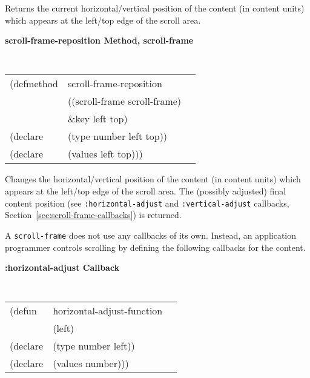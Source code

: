 \begin{flushright} \parbox[t]{6.125in}{
Returns the current horizontal/vertical position of the content (in content
units) which appears at the left/top edge of the scroll area.
}\end{flushright}

{\samepage
{\large {\bf scroll-frame-reposition \hfill Method, scroll-frame}}
\begin{flushright} \parbox[t]{6.125in}{
\tt
\begin{tabular}{lll}
\raggedright
(defmethod & scroll-frame-reposition & \\
& ((scroll-frame  scroll-frame)\\
& \&key left top) \\
(declare &(type number left top))\\
(declare & (values left top)))
\end{tabular}
\rm

}\end{flushright}}

\begin{flushright} \parbox[t]{6.125in}{ 
Changes the horizontal/vertical position
of the content (in content units) which appears at the left/top edge of the
scroll area.  The (possibly adjusted) final content position  (see
{\tt :horizontal-adjust} and {\tt :vertical-adjust}
callbacks, Section~\ref{sec:scroll-frame-callbacks}) is returned.

}\end{flushright}

	




              

A {\tt scroll-frame} does not use any
callbacks of its own.  Instead, an application programmer controls scrolling by
defining the following callbacks for the content.

{\samepage
{\large {\bf :horizontal-adjust \hfill Callback}} 
\begin{flushright} 
\parbox[t]{6.125in}{
\tt
\begin{tabular}{lll}
\raggedright
(defun & horizontal-adjust-function & \\ 
& (left) \\
(declare &(type  number  left))\\
(declare & (values   number)))
\end{tabular}
\rm

}\end{flushright}}

